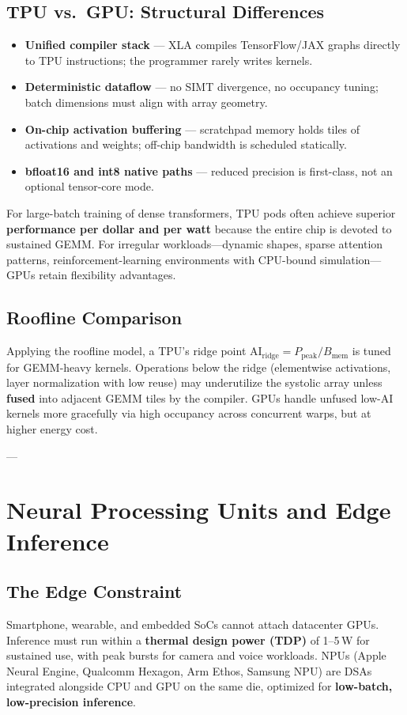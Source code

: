 \documentclass[11pt,journal,onecolumn]{IEEEtran}
\begin{document}
\subsection{TPU vs.\ GPU: Structural Differences}
\begin{itemize}
    \item \textbf{Unified compiler stack} --- XLA compiles TensorFlow/JAX graphs directly to TPU instructions; the programmer rarely writes kernels.
    \item \textbf{Deterministic dataflow} --- no SIMT divergence, no occupancy tuning; batch dimensions must align with array geometry.
    \item \textbf{On-chip activation buffering} --- scratchpad memory holds tiles of activations and weights; off-chip bandwidth is scheduled statically.
    \item \textbf{bfloat16 and int8 native paths} --- reduced precision is first-class, not an optional tensor-core mode.
\end{itemize}

For large-batch training of dense transformers, TPU pods often achieve superior \textbf{performance per dollar and per watt} because the entire chip is devoted to sustained GEMM. For irregular workloads---dynamic shapes, sparse attention patterns, reinforcement-learning environments with CPU-bound simulation---GPUs retain flexibility advantages.

\subsection{Roofline Comparison}
Applying the roofline model, a TPU's ridge point $\mathrm{AI}_{\mathrm{ridge}} = P_{\mathrm{peak}} / B_{\mathrm{mem}}$ is tuned for GEMM-heavy kernels. Operations below the ridge (elementwise activations, layer normalization with low reuse) may underutilize the systolic array unless \textbf{fused} into adjacent GEMM tiles by the compiler. GPUs handle unfused low-AI kernels more gracefully via high occupancy across concurrent warps, but at higher energy cost.

---

\section{Neural Processing Units and Edge Inference}

\subsection{The Edge Constraint}
Smartphone, wearable, and embedded SoCs cannot attach datacenter GPUs. Inference must run within a \textbf{thermal design power (TDP)} of 1--5\,W for sustained use, with peak bursts for camera and voice workloads. NPUs (Apple Neural Engine, Qualcomm Hexagon, Arm Ethos, Samsung NPU) are DSAs integrated alongside CPU and GPU on the same die, optimized for \textbf{low-batch, low-precision inference}.
\end{document}
